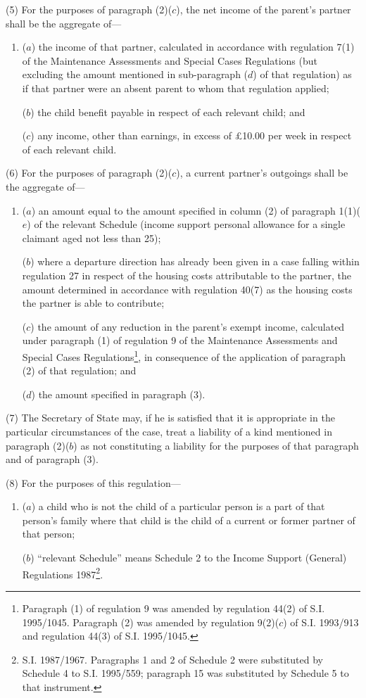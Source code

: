 \documentclass[a4paper]{article}
\begin{document}
(5) For the purposes of paragraph (2)($c$), the net income of the parent’s partner
shall be the aggregate of—
\begin{enumerate}\item[]
($a$) the income of that partner, calculated in accordance with regulation 7(1) of
the Maintenance Assessments and Special Cases Regulations (but excluding the
amount mentioned in sub-paragraph ($d$) of that regulation) as if that partner
were an absent parent to whom that regulation applied;

($b$) the child benefit payable in respect of each relevant child; and

($c$) any income, other than earnings, in excess of £10.00 per week in respect of
each relevant child.
\end{enumerate}

(6) For the purposes of paragraph (2)($c$), a current partner’s outgoings shall be
the aggregate of—
\begin{enumerate}\item[]
($a$) an amount equal to the amount specified in column (2) of paragraph 1(1)($e$) of
the relevant Schedule (income support personal allowance for a single claimant
aged not less than 25);

($b$) where a departure direction has already been given in a case falling within
regulation 27 in respect of the housing costs attributable to the partner, the
amount determined in accordance with regulation 40(7) as the housing costs the
partner is able to contribute;

($c$) the amount of any reduction in the parent’s exempt income, calculated under
paragraph (1) of regulation 9 of the Maintenance Assessments and Special Cases
Regulations\footnote{\frenchspacing Paragraph (1) of regulation 9 was amended by regulation 44(2) of S.I. 1995/1045. Paragraph (2) was amended by regulation 9(2)($c$) of S.I. 1993/913 and regulation 44(3) of S.I. 1995/1045.}, in consequence of the application of paragraph (2) of that
regulation; and

($d$) the amount specified in paragraph (3).
\end{enumerate}

(7) The Secretary of State may, if he is satisfied that it is appropriate in the
particular circumstances of the case, treat a liability of a kind mentioned in
paragraph (2)($b$) as not constituting a liability for the purposes of that
paragraph and of paragraph (3).

(8) For the purposes of this regulation—
\begin{enumerate}\item[]
($a$) a child who is not the child of a particular person is a part of that
person’s family where that child is the child of a current or former partner of
that person;

($b$) “relevant Schedule” means Schedule 2 to the Income Support (General)
Regulations 1987\footnote{\frenchspacing S.I. 1987/1967. Paragraphs 1 and 2 of Schedule 2 were substituted by Schedule 4 to S.I. 1995/559; paragraph 15 was substituted by Schedule 5 to that instrument.}.
\end{enumerate}
\end{document}
